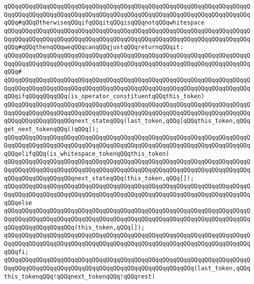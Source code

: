 \verb|qQQqqQQqqQQqqQQqqQQqqQQqqQQqqQQqqQQqqQQqqQQqqQQqqQQqqQQqqQQqqQQqqQQqqQQqqQQqqQQqqQQqqQQqqQQqqQQqqQQqqQQqqQQqqQQqqQQqqQQqqQQqqQQqqQQqqQQqqQQqqQQq#qQQqOtherwiseqQQqifqQQqitqQQqisqQQqnotqQQqwhitespace|\newline
\verb|qQQqqQQqqQQqqQQqqQQqqQQqqQQqqQQqqQQqqQQqqQQqqQQqqQQqqQQqqQQqqQQqqQQqqQQqqQQqqQQqqQQqqQQqqQQqqQQqqQQqqQQqqQQqqQQqqQQqqQQqqQQqqQQqqQQqqQQqqQQqqQQq#qQQqthenqQQqweqQQqcanqQQqjustqQQqreturnqQQqit:|\newline
\verb|qQQqqQQqqQQqqQQqqQQqqQQqqQQqqQQqqQQqqQQqqQQqqQQqqQQqqQQqqQQqqQQqqQQqqQQqqQQqqQQqqQQqqQQqqQQqqQQqqQQqqQQqqQQqqQQqqQQqqQQqqQQqqQQqqQQqqQQqqQQqqQQq#|\newline
\verb|qQQqqQQqqQQqqQQqqQQqqQQqqQQqqQQqqQQqqQQqqQQqqQQqqQQqqQQqqQQqqQQqqQQqqQQqqQQqqQQqqQQqqQQqqQQqqQQqqQQqqQQqqQQqqQQqqQQqqQQqqQQqqQQqqQQqqQQqqQQqqQQqifqQQqqQQqqQQq(is_operator_constituentqQQqthis_token)|\newline
\newline
\verb|qQQqqQQqqQQqqQQqqQQqqQQqqQQqqQQqqQQqqQQqqQQqqQQqqQQqqQQqqQQqqQQqqQQqqQQqqQQqqQQqqQQqqQQqqQQqqQQqqQQqqQQqqQQqqQQqqQQqqQQqqQQqqQQqqQQqqQQqqQQqqQQqqQQqqQQqqQQqqQQqnext_stateqQQq(last_token,qQQq[qQQqthis_token,qQQqget_next_tokenqQQq()qQQq]);|\newline
\newline
\verb|qQQqqQQqqQQqqQQqqQQqqQQqqQQqqQQqqQQqqQQqqQQqqQQqqQQqqQQqqQQqqQQqqQQqqQQqqQQqqQQqqQQqqQQqqQQqqQQqqQQqqQQqqQQqqQQqqQQqqQQqqQQqqQQqqQQqqQQqqQQqqQQqelifqQQq(is_whitespace_tokenqQQqthis_token)|\newline
\newline
\verb|qQQqqQQqqQQqqQQqqQQqqQQqqQQqqQQqqQQqqQQqqQQqqQQqqQQqqQQqqQQqqQQqqQQqqQQqqQQqqQQqqQQqqQQqqQQqqQQqqQQqqQQqqQQqqQQqqQQqqQQqqQQqqQQqqQQqqQQqqQQqqQQqqQQqqQQqqQQqqQQqnext_stateqQQq(this_token,qQQq[]);|\newline
\verb|qQQqqQQqqQQqqQQqqQQqqQQqqQQqqQQqqQQqqQQqqQQqqQQqqQQqqQQqqQQqqQQqqQQqqQQqqQQqqQQqqQQqqQQqqQQqqQQqqQQqqQQqqQQqqQQqqQQqqQQqqQQqqQQqqQQqqQQqqQQqqQQqelse|\newline
\verb|qQQqqQQqqQQqqQQqqQQqqQQqqQQqqQQqqQQqqQQqqQQqqQQqqQQqqQQqqQQqqQQqqQQqqQQqqQQqqQQqqQQqqQQqqQQqqQQqqQQqqQQqqQQqqQQqqQQqqQQqqQQqqQQqqQQqqQQqqQQqqQQqqQQqqQQqqQQqqQQq(this_token,qQQq[]);|\newline
\verb|qQQqqQQqqQQqqQQqqQQqqQQqqQQqqQQqqQQqqQQqqQQqqQQqqQQqqQQqqQQqqQQqqQQqqQQqqQQqqQQqqQQqqQQqqQQqqQQqqQQqqQQqqQQqqQQqqQQqqQQqqQQqqQQqqQQqqQQqqQQqqQQqfi;|\newline
\newline
\verb|qQQqqQQqqQQqqQQqqQQqqQQqqQQqqQQqqQQqqQQqqQQqqQQqqQQqqQQqqQQqqQQqqQQqqQQqqQQqqQQqqQQqqQQqqQQqqQQqqQQqqQQqqQQqqQQqqQQqqQQqqQQq(last_token,qQQqthis_tokenqQQq!qQQqnext_tokenqQQq!qQQqrest)|\newline
